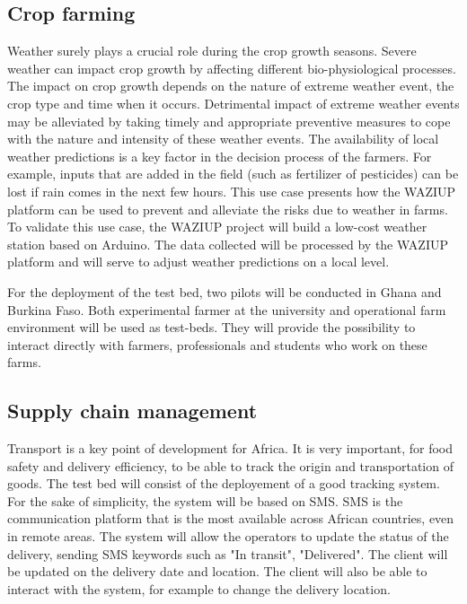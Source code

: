 \subsection{Crop farming}

Weather surely plays a crucial role during the crop growth seasons.
Severe weather can impact crop growth by affecting different bio-physiological processes.
The impact on crop growth depends on the nature of extreme weather event, the crop type and time when it occurs.
Detrimental impact of extreme weather events may be alleviated by taking timely and appropriate preventive measures to cope with the nature and intensity of these weather events.
The availability of local weather predictions is a key factor in the decision process of the farmers.
For example, inputs that are added in the field (such as fertilizer of pesticides) can be lost if rain comes in the next few hours.
This use case presents how the WAZIUP platform can be used to prevent and alleviate the risks due to weather in farms.
To validate this use case, the WAZIUP project will build a low-cost weather station based on Arduino.
The data collected will be processed by the WAZIUP platform and will serve to adjust weather predictions on a local level.

For the deployment of the test bed, two pilots will be conducted in Ghana and Burkina Faso.
Both experimental farmer at the university and operational farm environment will be used as test-beds.
They will provide the possibility to interact directly with farmers, professionals and students who work on these farms.

\subsection{Supply chain management}

Transport is a key point of development for Africa.
It is very important, for food safety and delivery efficiency, to be able to track the origin and transportation of goods.
The test bed will consist of the deployement of a good tracking system.
For the sake of simplicity, the system will be based on SMS.
SMS is the communication platform that is the most available across African countries, even in remote areas.
The system will allow the operators to update the status of the delivery, sending SMS keywords such as "In transit", "Delivered".
The client will be updated on the delivery date and location.
The client will also be able to interact with the system, for example to change the delivery location.


